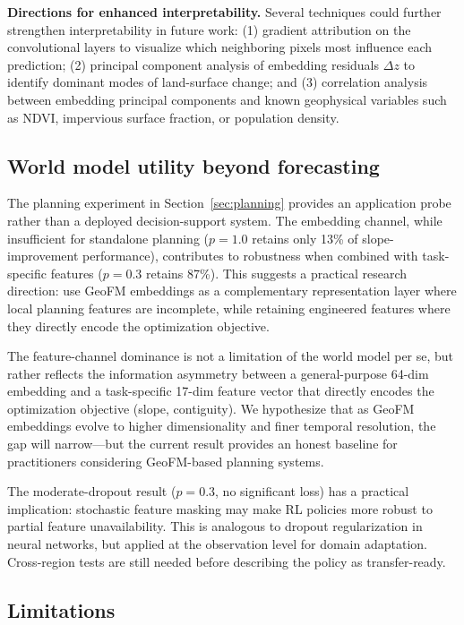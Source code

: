 \documentclass{article}
\begin{document}
\textbf{Directions for enhanced interpretability.}
Several techniques could further strengthen interpretability in future work: (1) gradient attribution on the convolutional layers to visualize which neighboring pixels most influence each prediction; (2) principal component analysis of embedding residuals $\Delta z$ to identify dominant modes of land-surface change; and (3) correlation analysis between embedding principal components and known geophysical variables such as NDVI, impervious surface fraction, or population density.

\subsection{World model utility beyond forecasting}

The planning experiment in Section~\ref{sec:planning} provides an application probe rather than a deployed decision-support system. The embedding channel, while insufficient for standalone planning ($p=1.0$ retains only 13\% of slope-improvement performance), contributes to robustness when combined with task-specific features ($p=0.3$ retains 87\%). This suggests a practical research direction: use GeoFM embeddings as a complementary representation layer where local planning features are incomplete, while retaining engineered features where they directly encode the optimization objective.

The feature-channel dominance is not a limitation of the world model per se, but rather reflects the information asymmetry between a general-purpose 64-dim embedding and a task-specific 17-dim feature vector that directly encodes the optimization objective (slope, contiguity). We hypothesize that as GeoFM embeddings evolve to higher dimensionality and finer temporal resolution, the gap will narrow---but the current result provides an honest baseline for practitioners considering GeoFM-based planning systems.

The moderate-dropout result ($p=0.3$, no significant loss) has a practical implication: stochastic feature masking may make RL policies more robust to partial feature unavailability. This is analogous to dropout regularization in neural networks, but applied at the observation level for domain adaptation. Cross-region tests are still needed before describing the policy as transfer-ready.

\subsection{Limitations}
\end{document}
